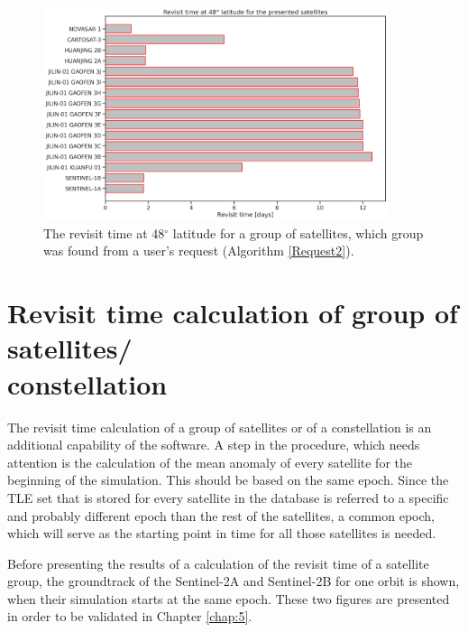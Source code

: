 \begin{figure}
\centering
\includegraphics[width=0.9\textwidth]{Images/revisit_time_at_latitude_48.png}
\caption{The revisit time at 48$^{\circ}$ latitude for a group of satellites, which group was found from a user's request (Algorithm \ref{Request2}).}
\label{revisit_time_at_latitude_48}
\end{figure}

\bigskip
\section{Revisit time calculation of group of satellites/ \\constellation}
\bigskip

The revisit time calculation of a group of satellites or of a constellation is an additional capability of the software. A step in the procedure, which needs attention is the calculation of the mean anomaly of every satellite for the beginning of the simulation. This should be based on the same epoch. Since the TLE set that is stored for every satellite in the database is referred to a specific and probably different epoch than the rest of the satellites, a common epoch, which will serve as the starting point in time for all those satellites is needed.

Before presenting the results of a calculation of the revisit time of a satellite group, the groundtrack of the Sentinel-2A and Sentinel-2B for one orbit is shown, when their simulation starts at the same epoch. These two figures are presented in order to be validated in Chapter \ref{chap:5}. 

